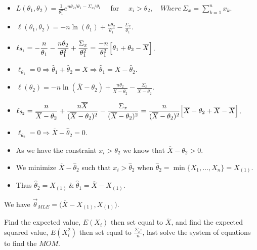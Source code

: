 \documentclass[12pt]{article}
\newcommand{\ds}{\displaystyle}
\begin{document}
\begin{itemize}
    \item $ \ds L(\theta_{1}, \theta_{2}) = \frac{1}{\theta_{1}^{n}} e^{n \theta_{2} / \theta_{1} - \Sigma_{x} / \theta_{1}} \quad $ for $ \quad  x_{i} > \theta_{2},  \quad Where \ \Sigma_{x} = \sum_{k=1}^{n} x_{k} $.
    \item $ \ds \ell(\theta_{1}, \theta_{2}) = -n\ln(\theta_{1}) + \frac{n\theta_{2}}{\theta_{1}} - \frac{\Sigma_{x}}{\theta_{1}} $.
    \item $ \ds \ell_{\theta_{1}} = -\frac{n}{\theta_{1}} - \frac{n\theta_{2}}{\theta_{1}^{2}} + \frac{\Sigma_{x}}{\theta_{1}^{2}} = \frac{-n}{\theta_{1}^{2}} \Bigl[ \theta_{1} + \theta_{2} - \overline{X} \Bigr] $.
    \item $ \ds \ell_{\theta_{1}} = 0 \Rightarrow \hat{\theta}_{1} + \hat{\theta}_{2}  = \overline{X} \Rightarrow \hat{\theta}_{1} = \overline{X} - \hat{\theta}_{2}  $.
    \item $ \ds \ell(\theta_{2}) = -n\ln(\overline{X} - \theta_{2}) + \frac{n\theta_{2}}{\overline{X} - \theta_{2}} - \frac{\Sigma_{x}}{\overline{X} - \theta_{2}} $.
    \item $ \ds \ell_{\theta_{2}} = \frac{n}{\overline{X} - \theta_{2}} + \frac{n\overline{X}}{(\overline{X} - \theta_{2})^{2}} - \frac{\Sigma_{x}}{(\overline{X} - \theta_{2})^{2}} = \frac{n}{(\overline{X} - \theta_{2})^{2}} \Bigl[ \overline{X} - \theta_{2} + \overline{X} - \overline{X}  \Bigr] $.
    \item $ \ds \ell_{\theta_{2}} = 0 \Rightarrow \overline{X} - \hat{\theta}_{2} = 0 $.
    \item As we have the constraint $ x_{i} > \theta_{2} $ we know that $ \overline{X} - \theta_{2} > 0 $.
    \item We minimize $ \overline{X} - \hat{\theta}_{2} $ such that $ x_{i} > \hat{\theta}_{2} $ when $ \hat{\theta}_{2} = \min\{X_{1}, \dots , X_{n}\} = X_{(1)} $.
    \item Thus $ \hat{\theta}_{2} = X_{(1)} \ \& \ \hat{\theta}_{1} = \overline{X} - X_{(1)} $.
\end{itemize}

We have $ \overrightarrow{\theta}_{MLE} = \bigl( \overline{X} - X_{(1)}, X_{(1)} \bigr) $.

\newpage

\noindent
Find the expected value, $ E(X_{i}) $ then set equal to $ \overline{X} $, and find the expected squared value, $ E( X_{i}^{2} ) $ then set equal to $ \ds \frac{\Sigma_{x^{2}}}{n} $, last solve the system of equations to find the $ MOM $.
\end{document}
